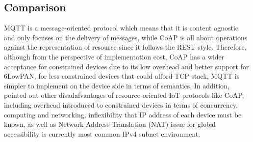 
\subsection{Comparison}





MQTT is a message-oriented protocol which means that it is content agnostic and only focuses on the delivery of messages, while CoAP is all about operations against the representation of resource since it follows the REST style. Therefore, although from the perspective of implementation cost, CoAP has a wider acceptance for constrained devices due to its low overhead and better support for 6LowPAN, for less constrained devices that could afford TCP stack, MQTT is simpler to implement on the device side in terms of semantics. In addition, \textcite{6918928} pointed out other disadafvantages of resource-oriented IoT protocols like CoAP, including overhead introduced to constrained devices in terms of concurrency, computing and networking, inflexibility that IP address of each device must be known, as well as Network Address Translation (NAT) issue for global accessibility is currently most common IPv4 subnet environment. 

